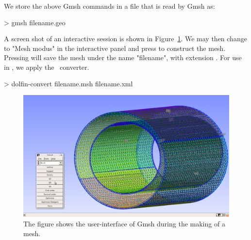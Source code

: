 We store the above Gmsh commands in a  file that is read by Gmsh as:
\begin{bash}
> gmsh filename.geo
\end{bash}
A screen shot of an interactive session is shown in
Figure~\ref{fig:Gmsh_mesh}.  We may then change to "Mesh modus" in the
interactive panel and press  to construct the
mesh. Pressing  will save the mesh under the name
"filename", with extension . For use in \dolfin, we apply
the \dolfin\ converter.

\begin{bash}
> dolfin-convert filename.msh filename.xml
\end{bash}

\begin{figure}
  \center
  \includegraphics[width=\largefig]{chapters/hentschel/pdf/gmsh.pdf}
  \caption{The figure shows the user-interface of Gmsh during the making
    of a mesh.}
  \label{fig:Gmsh_mesh}
\end{figure}

